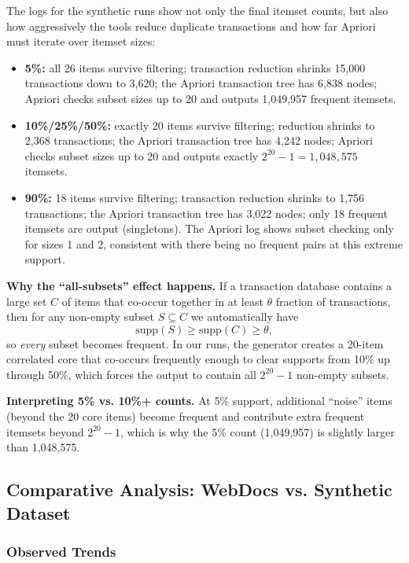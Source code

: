 \documentclass[11pt]{article}
\begin{document}
The logs for the synthetic runs show not only the final itemset counts, but also how aggressively the tools reduce duplicate transactions and how far Apriori must iterate over itemset sizes:
\begin{itemize}
    \item \textbf{5\%:} all 26 items survive filtering; transaction reduction shrinks 15,000 transactions down to 3,620; the Apriori transaction tree has 6,838 nodes; Apriori checks subset sizes up to 20 and outputs 1,049,957 frequent itemsets.
    \item \textbf{10\%/25\%/50\%:} exactly 20 items survive filtering; reduction shrinks to 2,368 transactions; the Apriori transaction tree has 4,242 nodes; Apriori checks subset sizes up to 20 and outputs exactly $2^{20}-1=1{,}048{,}575$ itemsets.
    \item \textbf{90\%:} 18 items survive filtering; transaction reduction shrinks to 1,756 transactions; the Apriori transaction tree has 3,022 nodes; only 18 frequent itemsets are output (singletons). The Apriori log shows subset checking only for sizes 1 and 2, consistent with there being no frequent pairs at this extreme support.
\end{itemize}

\noindent\textbf{Why the ``all-subsets'' effect happens.} If a transaction database contains a large set $C$ of items that co-occur together in at least $\theta$ fraction of transactions, then for any non-empty subset $S \subseteq C$ we automatically have
$$\mathrm{supp}(S) \ge \mathrm{supp}(C) \ge \theta,$$
so \emph{every} subset becomes frequent. In our runs, the generator creates a 20-item correlated core that co-occurs frequently enough to clear supports from 10\% up through 50\%, which forces the output to contain all $2^{20}-1$ non-empty subsets.

\noindent\textbf{Interpreting 5\% vs. 10\%+ counts.} At 5\% support, additional ``noise'' items (beyond the 20 core items) become frequent and contribute extra frequent itemsets beyond $2^{20}-1$, which is why the 5\% count (1,049,957) is slightly larger than 1,048,575.

\subsection{Comparative Analysis: WebDocs vs. Synthetic Dataset}

\subsubsection{Observed Trends}
\end{document}
